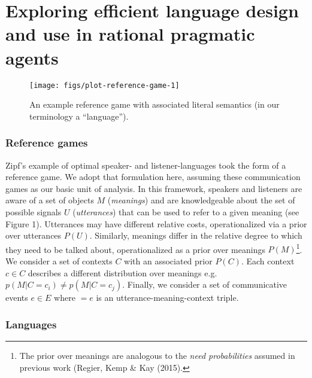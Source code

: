 \documentclass[10pt, letterpaper]{article}
\newenvironment{CodeChunk}{}{}
\begin{document}
\section{Exploring efficient language design and use in rational
pragmatic
agents}\label{exploring-efficient-language-design-and-use-in-rational-pragmatic-agents}

\begin{CodeChunk}
\begin{figure}[H]

{\centering \texttt{[image: figs/plot-reference-game-1]} 

}

\caption[An example reference game with associated literal semantics (in our terminology a ``language'')]{An example reference game with associated literal semantics (in our terminology a ``language'').}\label{fig:plot-reference-game}
\end{figure}
\end{CodeChunk}

\subsubsection{Reference games}\label{reference-games}

Zipf's example of optimal speaker- and listener-languages took the form
of a reference game. We adopt that formulation here, assuming these
communication games as our basic unit of analysis. In this framework,
speakers and listeners are aware of a set of objects \(M\)
(\emph{meanings}) and are knowledgeable about the set of possible
signals \(U\) (\emph{utterances}) that can be used to refer to a given
meaning (see Figure 1). Utterances may have different relative costs,
operationalized via a prior over utterances \(P(U)\). Similarly,
meanings differ in the relative degree to which they need to be talked
about, operationalized as a prior over meanings
\(P(M)\)\footnote{The prior over meanings are analogous to the \textit{need probabilities} assumed in previous work (Regier, Kemp \& Kay (2015).}.
We consider a set of contexts \(C\) with an associated prior \(P(C)\).
Each context \(c\in C\) describes a different distribution over meanings
e.g. \(p(M|C=c_i) \neq p(M|C=c_j)\). Finally, we consider a set of
communicative events \(e \in E\) where \(<u, m, c> = e\) is an
utterance-meaning-context triple.\par

\subsubsection{Languages}\label{languages}
\end{document}
